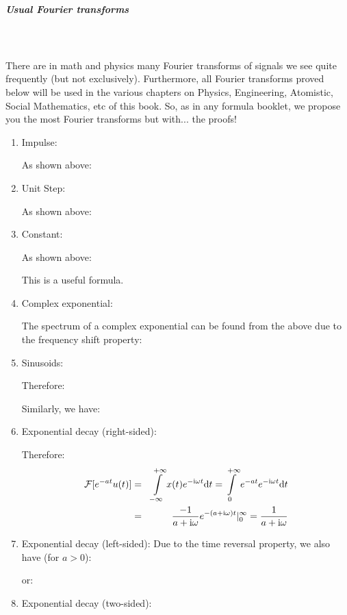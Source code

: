 	\subparagraph{Usual Fourier transforms}\mbox{}\\\\
	There are in math and physics many Fourier transforms of signals we see quite frequently (but not exclusively). Furthermore, all Fourier transforms proved below will be used in the various chapters on Physics, Engineering, Atomistic, Social Mathematics, etc of this book. So, as in any formula booklet, we propose you the most Fourier transforms but with... the proofs!
	\begin{enumerate}
	
	\item Impulse:
	
	As shown above:
	
	
	\item Unit Step:
	
	As shown above:
	
	
	\item Constant:
	
	As shown above:
	
	This is a useful formula.
	
	\item Complex exponential:
	
	The spectrum of a complex exponential can be found from the above due to the frequency shift property:
	
	
	\item Sinusoids:
	
	
	Therefore:
	
	Similarly, we have:
	
	
	\item Exponential decay (right-sided):
	
	Therefore:
	\begin{eqnarray}
	{\cal F}[e^{-at}u(t)]&=&\int\limits_{-\infty}^{+\infty} x(t)e^{-\mathrm{i}\omega t}\mathrm{d}t=\int\limits_0^{+\infty} 
		e^{-at}e^{-\mathrm{i}\omega t}\mathrm{d}t
		\nonumber \\
	&=& \frac{-1}{a+\mathrm{i}\omega} e^{-(a+\mathrm{i}\omega)t}|_0^{\infty}=\frac{1}{a+\mathrm{i}\omega}
		\nonumber
	\end{eqnarray}
	
	\item Exponential decay (left-sided):
	Due to the time reversal property, we also have (for $a>0$):
	
	or:
	
	
	\item Exponential decay (two-sided):
	

\end{enumerate}
